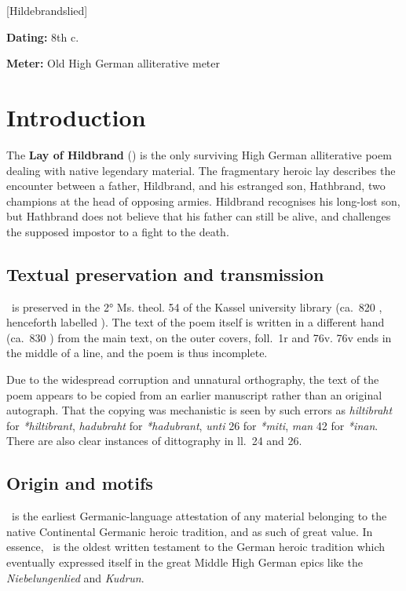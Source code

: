 [Hildebrandslied]

\begin{flushright}%
\textbf{Dating:} 8th c.

\textbf{Meter:} Old High German alliterative meter
\end{flushright}%

\section{Introduction}

The \textbf{Lay of Hildbrand} (\Hildebrandslied) is the only surviving High German alliterative poem dealing with native legendary material.  The fragmentary heroic lay describes the encounter between a father, Hildbrand, and his estranged son, Hathbrand, two champions at the head of opposing armies.  Hildbrand recognises his long-lost son, but Hathbrand does not believe that his father can still be alive, and challenges the supposed impostor to a fight to the death.

\subsection{Textual preservation and transmission}

\Hildebrandslied\ is preserved in the 2° Ms. theol. 54 of the Kassel university library (ca.~820 \ce, henceforth labelled \HildMS).  The text of the poem itself is written in a different hand (ca.~830 \ce) from the main text, on the outer covers, foll.~1r and 76v.  76v ends in the middle of a line, and the poem is thus incomplete.

Due to the widespread corruption and unnatural orthography, the text of the poem appears to be copied from an earlier manuscript rather than an original autograph.
That the copying was mechanistic is seen by such errors as \emph{hiltibraht} for \emph{*hiltibrant}, \emph{hadubraht} for \emph{*hadubrant}, \emph{unti} 26 for \emph{*miti}, \emph{man} 42 for \emph{*inan}.  There are also clear instances of dittography in ll.~24 and 26.

\subsection{Origin and motifs}

\Hildebrandslied\ is the earliest Germanic-language attestation of any material belonging to the native Continental Germanic heroic tradition, and as such of great value.  In essence, \Hildebrandslied\ is the oldest written testament to the German heroic tradition which eventually expressed itself in the great Middle High German epics like the \emph{Niebelungenlied} and \emph{Kudrun}.


